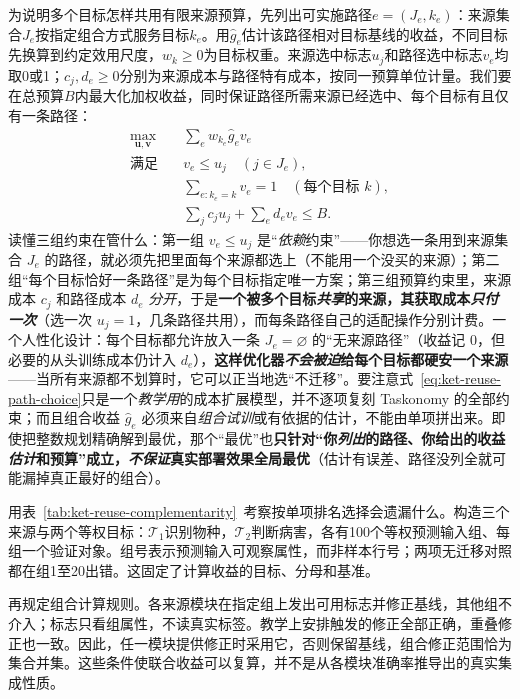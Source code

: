 为说明多个目标怎样共用有限来源预算，先列出可实施路径$e=(J_e,k_e)$：来源集合$J_e$按指定组合方式服务目标$k_e$。用$\hat g_e$估计该路径相对目标基线的收益，不同目标先换算到约定效用尺度，$w_k\geq0$为目标权重。来源选中标志$u_j$和路径选中标志$v_e$均取0或1；$c_j,d_e\geq0$分别为来源成本与路径特有成本，按同一预算单位计量。我们要在总预算$B$内最大化加权收益，同时保证路径所需来源已经选中、每个目标有且仅有一条路径：
\begin{equation}
  \begin{aligned}
    \max_{\bm u,\bm v}\quad
      &\sum_e w_{k_e}\hat g_ev_e\\
    \text{满足}\quad
      &v_e\leq u_j \quad(j\in J_e),\\
      &\sum_{e:k_e=k}v_e=1 \quad(\text{每个目标 }k),\\
      &\sum_jc_ju_j+\sum_ed_ev_e\leq B.
  \end{aligned}
  \label{eq:ket-reuse-path-choice}
\end{equation}
读懂三组约束在管什么：第一组 $v_e\leq u_j$ 是“\emph{依赖}约束”——你想选一条用到来源集合 $J_e$ 的路径，就必须先把里面每个来源都选上（不能用一个没买的来源）；第二组“每个目标恰好一条路径”是为每个目标指定唯一方案；第三组预算约束里，来源成本 $c_j$ 和路径成本 $d_e$ \emph{分开}，于是\textbf{一个被多个目标\emph{共享}的来源，其获取成本\emph{只付一次}}（选一次 $u_j=1$，几条路径共用），而每条路径自己的适配操作分别计费。一个人性化设计：每个目标都允许放入一条 $J_e=\varnothing$ 的“无来源路径”（收益记 0，但必要的从头训练成本仍计入 $d_e$），\textbf{这样优化器\emph{不会被迫}给每个目标都硬安一个来源}——当所有来源都不划算时，它可以正当地选“不迁移”。要注意式~\eqref{eq:ket-reuse-path-choice}只是一个\emph{教学用}的成本扩展模型，并不逐项复刻 Taskonomy 的全部约束；而且组合收益 $\hat g_e$ 必须来自\emph{组合试训}或有依据的估计，不能由单项拼出来。即使把整数规划精确解到最优，那个“最优”也\textbf{只针对“你\emph{列出}的路径、你给出的收益\emph{估计}和预算”成立，\emph{不保证}真实部署效果全局最优}（估计有误差、路径没列全就可能漏掉真正最好的组合）。

用表~\ref{tab:ket-reuse-complementarity}~考察按单项排名选择会遗漏什么。构造三个来源与两个等权目标：$\mathcal T_1$识别物种，$\mathcal T_2$判断病害，各有100个等权预测输入组、每组一个验证对象。组号表示预测输入可观察属性，而非样本行号；两项无迁移对照都在组1至20出错。这固定了计算收益的目标、分母和基准。

再规定组合计算规则。各来源模块在指定组上发出可用标志并修正基线，其他组不介入；标志只看组属性，不读真实标签。教学上安排触发的修正全部正确，重叠修正也一致。因此，任一模块提供修正时采用它，否则保留基线，组合修正范围恰为集合并集。这些条件使联合收益可以复算，并不是从各模块准确率推导出的真实集成性质。

